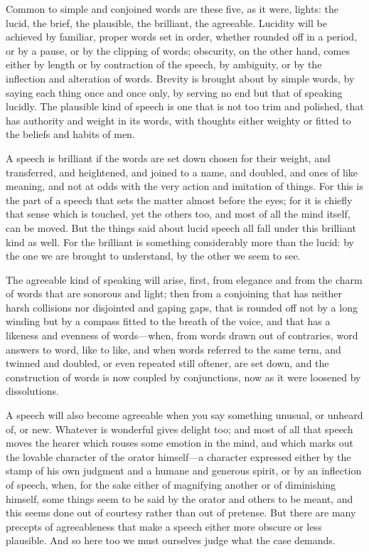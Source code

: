  Common to simple and conjoined words are these five, as it were, lights: the lucid, the brief, the plausible, the brilliant, the agreeable. Lucidity will be achieved by familiar, proper words set in order, whether rounded off in a period, or by a pause, or by the clipping of words; obscurity, on the other hand, comes either by length or by contraction of the speech, by ambiguity, or by the inflection and alteration of words. Brevity is brought about by simple words, by saying each thing once and once only, by serving no end but that of speaking lucidly. The plausible kind of speech is one that is not too trim and polished, that has authority and weight in its words, with thoughts either weighty or fitted to the beliefs and habits of men.

 A speech is brilliant if the words are set down chosen for their weight, and transferred, and heightened, and joined to a name, and doubled, and ones of like meaning, and not at odds with the very action and imitation of things. For this is the part of a speech that sets the matter almost before the eyes; for it is chiefly that sense which is touched, yet the others too, and most of all the mind itself, can be moved. But the things said about lucid speech all fall under this brilliant kind as well. For the brilliant is something considerably more than the lucid: by the one we are brought to understand, by the other we seem to see.

 The agreeable kind of speaking will arise, first, from elegance and from the charm of words that are sonorous and light; then from a conjoining that has neither harsh collisions nor disjointed and gaping gaps, that is rounded off not by a long winding but by a compass fitted to the breath of the voice, and that has a likeness and evenness of words—when, from words drawn out of contraries, word answers to word, like to like, and when words referred to the same term, and twinned and doubled, or even repeated still oftener, are set down, and the construction of words is now coupled by conjunctions, now as it were loosened by dissolutions.

 A speech will also become agreeable when you say something unusual, or unheard of, or new. Whatever is wonderful gives delight too; and most of all that speech moves the hearer which rouses some emotion in the mind, and which marks out the lovable character of the orator himself—a character expressed either by the stamp of his own judgment and a humane and generous spirit, or by an inflection of speech, when, for the sake either of magnifying another or of diminishing himself, some things seem to be said by the orator and others to be meant, and this seems done out of courtesy rather than out of pretense. But there are many precepts of agreeableness that make a speech either more obscure or less plausible. And so here too we must ourselves judge what the case demands.

